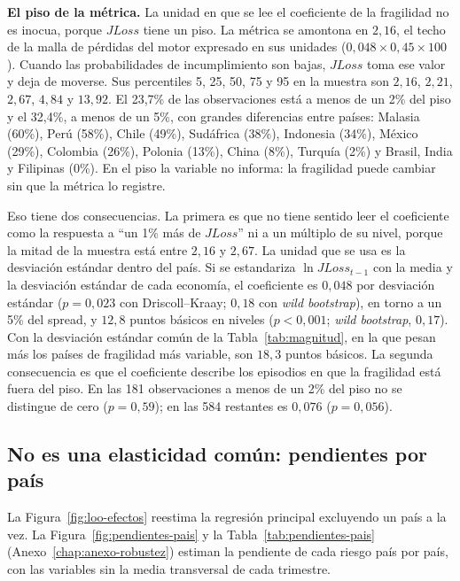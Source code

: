 \textbf{El piso de la métrica.} La unidad en que se lee el coeficiente de la fragilidad no es inocua, porque $JLoss$ tiene un piso. La métrica se amontona en $2{,}16$, el techo de la malla de pérdidas del motor expresado en sus unidades ($0{,}048\times0{,}45\times100$). Cuando las probabilidades de incumplimiento son bajas, $JLoss$ toma ese valor y deja de moverse. Sus percentiles 5, 25, 50, 75 y 95 en la muestra son $2{,}16$, $2{,}21$, $2{,}67$, $4{,}84$ y $13{,}92$. El 23,7\% de las observaciones está a menos de un 2\% del piso y el 32,4\%, a menos de un 5\%, con grandes diferencias entre países: Malasia (60\%), Perú (58\%), Chile (49\%), Sudáfrica (38\%), Indonesia (34\%), México (29\%), Colombia (26\%), Polonia (13\%), China (8\%), Turquía (2\%) y Brasil, India y Filipinas (0\%). En el piso la variable no informa: la fragilidad puede cambiar sin que la métrica lo registre.

Eso tiene dos consecuencias. La primera es que no tiene sentido leer el coeficiente como la respuesta a ``un 1\% más de $JLoss$'' ni a un múltiplo de su nivel, porque la mitad de la muestra está entre $2{,}16$ y $2{,}67$. La unidad que se usa es la desviación estándar dentro del país. Si se estandariza $\ln JLoss_{t-1}$ con la media y la desviación estándar de cada economía, el coeficiente es $0{,}048$ por desviación estándar ($p=0{,}023$ con Driscoll--Kraay; $0{,}18$ con \textit{wild bootstrap}), en torno a un 5\% del spread, y $12{,}8$ puntos básicos en niveles ($p<0{,}001$; \textit{wild bootstrap}, $0{,}17$). Con la desviación estándar común de la Tabla~\ref{tab:magnitud}, en la que pesan más los países de fragilidad más variable, son $18{,}3$ puntos básicos. La segunda consecuencia es que el coeficiente describe los episodios en que la fragilidad está fuera del piso. En las 181 observaciones a menos de un 2\% del piso no se distingue de cero ($p=0{,}59$); en las 584 restantes es $0{,}076$ ($p=0{,}056$).

\subsection{No es una elasticidad común: pendientes por país}
\label{sec:loo-efectos}

La Figura~\ref{fig:loo-efectos} reestima la regresión principal excluyendo un país a la vez. La Figura~\ref{fig:pendientes-pais} y la Tabla~\ref{tab:pendientes-pais} (Anexo~\ref{chap:anexo-robustez}) estiman la pendiente de cada riesgo país por país, con las variables sin la media transversal de cada trimestre.


